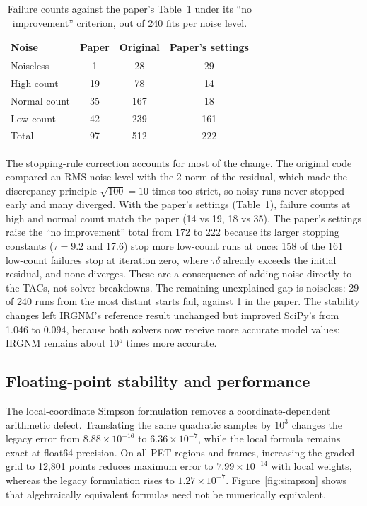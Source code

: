 \documentclass[sigconf,nonacm]{acmart}
\begin{document}
\begin{table}[!htb]
\caption{Failure counts against the paper's Table~1 under its ``no improvement'' criterion, out of 240 fits per noise level.}
\label{tab:failure-counts}
\small
\begin{tabular}{lccc}
\toprule
Noise & Paper & Original & Paper's settings \\
\midrule
Noiseless & 1 & 28 & 29 \\
High count & 19 & 78 & 14 \\
Normal count & 35 & 167 & 18 \\
Low count & 42 & 239 & 161 \\
\midrule
Total & 97 & 512 & 222 \\
\bottomrule
\end{tabular}
\end{table}

The stopping-rule correction accounts for most of the change. The original code compared an RMS noise level with the 2-norm of the residual, which made the discrepancy principle $\sqrt{100}=10$ times too strict, so noisy runs never stopped early and many diverged. With the paper's settings (Table~\ref{tab:failure-counts}), failure counts at high and normal count match the paper (14 vs 19, 18 vs 35). The paper's settings raise the ``no improvement'' total from 172 to 222 because its larger stopping constants ($\tau=9.2$ and 17.6) stop more low-count runs at once: 158 of the 161 low-count failures stop at iteration zero, where $\tau\delta$ already exceeds the initial residual, and none diverges. These are a consequence of adding noise directly to the TACs, not solver breakdowns. The remaining unexplained gap is noiseless: 29 of 240 runs from the most distant starts fail, against 1 in the paper. The stability changes left IRGNM's reference result unchanged but improved SciPy's from 1.046 to 0.094, because both solvers now receive more accurate model values; IRGNM remains about $10^5$ times more accurate.

\subsection{Floating-point stability and performance}

The local-coordinate Simpson formulation removes a coordinate-dependent arithmetic defect. Translating the same quadratic samples by $10^3$ changes the legacy error from $8.88\times10^{-16}$ to $6.36\times10^{-7}$, while the local formula remains exact at float64 precision. On all PET regions and frames, increasing the graded grid to 12,801 points reduces maximum error to $7.99\times10^{-14}$ with local weights, whereas the legacy formulation rises to $1.27\times10^{-7}$. Figure~\ref{fig:simpson} shows that algebraically equivalent formulas need not be numerically equivalent.
\end{document}
